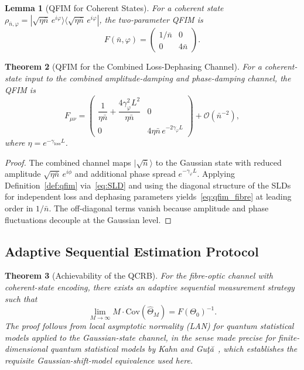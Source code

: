 \documentclass[journal,twocolumn]{IEEEtran}
\theoremstyle{definition}
\theoremstyle{plain}
\newtheorem{theorem}{Theorem}[section]
\newtheorem{lemma}[theorem]{Lemma}
\begin{document}
\begin{lemma}[QFIM for Coherent States]
\label{lem:qfim_coherent}
For a coherent state $\rho_{\bar n, \varphi} =
|\sqrt{\eta\bar n}\,e^{i\varphi}\rangle
\langle\sqrt{\eta\bar n}\,e^{i\varphi}|$, the two-parameter QFIM is
\begin{equation}
  F(\bar n, \varphi) =
  \begin{pmatrix} 1/\bar n & 0 \\ 0 & 4\bar n \end{pmatrix}.
  \label{eq:qfim_coherent}
\end{equation}
\end{lemma}

\begin{theorem}[QFIM for the Combined Loss-Dephasing Channel]
\label{thm:qfim_fibre}
For a coherent-state input to the combined amplitude-damping and
phase-damping channel, the QFIM is
\begin{equation}
  F_{\mu\nu} =
  \begin{pmatrix}
    \dfrac{1}{\eta\bar n} + \dfrac{4\gamma_\varphi^2 L^2}{\eta\bar n}
    & 0 \\[8pt]
    0 & 4\eta\bar n\,e^{-2\gamma_\varphi L}
  \end{pmatrix}
  + \mathcal{O}(\bar n^{-2}),
  \label{eq:qfim_fibre}
\end{equation}
where $\eta = e^{-\gamma_{\mathrm{loss}} L}$.
\end{theorem}

\begin{proof}
The combined channel maps $|\sqrt{\bar n}\rangle$ to the Gaussian
state with reduced amplitude $\sqrt{\eta\bar n}\,e^{i\phi}$ and
additional phase spread $e^{-\gamma_\varphi L}$.  Applying
Definition~\ref{def:qfim} via~\eqref{eq:SLD} and using the diagonal
structure of the SLDs for independent loss and dephasing parameters
yields~\eqref{eq:qfim_fibre} at leading order in $1/\bar n$.  The
off-diagonal terms vanish because amplitude and phase fluctuations
decouple at the Gaussian level.
\end{proof}

\subsection{Adaptive Sequential Estimation Protocol}

\begin{theorem}[Achievability of the QCRB]
\label{thm:qcrb_achieve}
For the fibre-optic channel with coherent-state encoding, there
exists an adaptive sequential measurement strategy such that
\begin{equation}
  \lim_{M\to\infty} M\cdot \mathrm{Cov}(\hat\Theta_M) =
  F(\Theta_0)^{-1}.
  \label{eq:lan}
\end{equation}
The proof follows from local asymptotic normality (LAN) for
quantum statistical models applied to the Gaussian-state channel,
in the sense made precise for finite-dimensional quantum statistical
models by Kahn and Gu\c{t}\u{a}~\cite{kahnguta2009}, which
establishes the requisite Gaussian-shift-model equivalence used
here.
\end{theorem}
\end{document}
